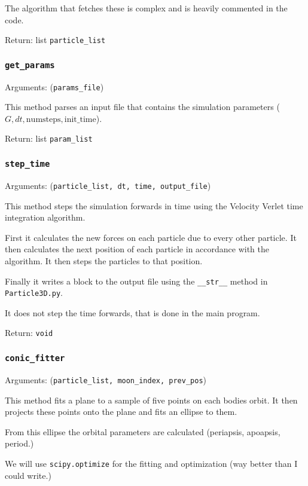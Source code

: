 \documentclass[a4paper, 11pt, british, left=1in, right=1in, top=0.3in, bottom=1in]{article}
\begin{document}
	The algorithm that fetches these is complex and is heavily commented in the code. 
	
	Return: list \texttt{particle\_list}
	
	\subsubsection{\texttt{get\_params}}
	
	Arguments: (\texttt{params\_file})
	
	This method parses an input file that contains the simulation parameters ($G, dt, \text{numsteps}, \text{init\_time}$).
	
	
	Return: list \texttt{param\_list}
	
	\subsubsection{\texttt{step\_time}}
	
	Arguments: (\texttt{particle\_list, dt, time, output\_file})
	
	This method steps the simulation forwards in time using the Velocity Verlet time integration algorithm. 
	
	First it calculates the new forces on each particle due to every other particle. It then calculates the next position of each particle in accordance with the algorithm. It then steps the particles to that position. 
	
	Finally it writes a block to the output file using the \texttt{\_\_str\_\_} method in \texttt{Particle3D.py}.
	
	It does not step the time forwards, that is done in the main program.
	
	Return: \texttt{void}
	
	\subsubsection{\texttt{conic\_fitter}}
	
	Arguments: (\texttt{particle\_list, moon\_index, prev\_pos})
	
	This method fits a plane to a sample of  five points on each bodies orbit. It then projects these points onto the plane and fits an ellipse to them. 
	
	From this ellipse the orbital parameters are calculated (periapsis, apoapsis, period.)
	
	We will use \texttt{scipy.optimize} for the fitting and optimization (way better than I could write.)
	
\end{document}
